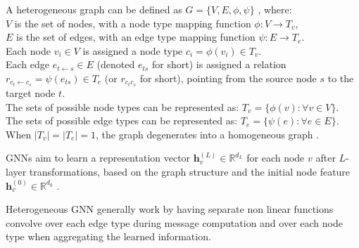 \documentclass{report} %
\begin{document}
A heterogeneous graph can be defined as \( G = \{ V, E, \phi, \psi \} \) \cite{SE HGNN-2023}, where: \\
\( V \) is the set of nodes, with a node type mapping function \( \phi : V \rightarrow T_v \), \\
\( E \) is the set of edges, with an edge type mapping function \( \psi : E \rightarrow T_e \).\\

Each node \( v_i \in V \) is assigned a node type \( c_i = \phi(v_i) \in T_v \). \cite{SE HGNN-2023}\\
Each edge \( e_{t \leftarrow s} \in E \) (denoted \( e_{ts} \) for short) is assigned a relation \( r_{c_t \leftarrow c_s} = \psi(e_{ts}) \in T_e \) (or \( r_{c_t c_s} \) for short), pointing from the source node \( s \) to the target node \( t \). \cite{SE HGNN-2023}\\

The sets of possible node types can be represented as:
\( T_v = \{ \phi(v) : \forall v \in V \} \). \\
The sets of possible edge types can be represented as:
\( T_e = \{ \psi(e) : \forall e \in E \}.\) \\
When \( |T_v| = |T_e| = 1 \), the graph degenerates into a homogeneous graph \cite{SE HGNN-2023}.

GNNs aim to learn a representation vector \( \mathbf{h}^{(L)}_v \in \mathbb{R}^{d_L} \) for each node \( v \) after \( L \)-layer transformations, 
based on the graph structure and the initial node feature \( \mathbf{h}^{(0)}_v \in \mathbb{R}^{d_0} \) \cite{REF HGNN-2021}.

Heterogeneous \ac{GNN} generally work by having separate non linear functions convolve over each edge type during message computation and over each node type when aggregating the learned information. \\

\end{document}
